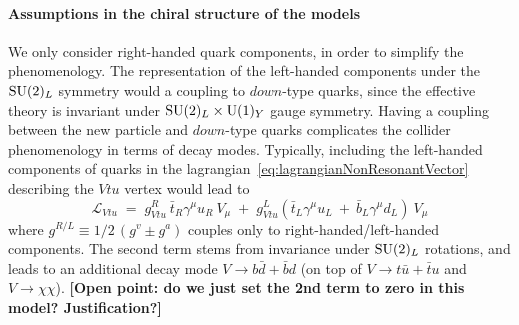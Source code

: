 
% 
\paragraph{Assumptions in the chiral structure of the models}

We only consider right-handed quark components, in order to simplify the phenomenology. 
The representation of the left-handed components under the $\mathrm{SU}(2)_{L}$ symmetry would a 
coupling to $down$-type quarks, since the effective theory is invariant under $\mathrm{SU}(2)_{L} \times \mathrm{U}(1)_{Y}$ 
gauge symmetry. Having a coupling between the new particle and $down$-type quarks 
complicates the collider phenomenology in terms of decay modes. Typically, including 
the left-handed components of quarks in the lagrangian~\eqref{eq:lagrangianNonResonantVector} 
describing the $Vtu$ vertex would lead to 
\begin{equation}
 \mathcal{L}_{Vtu} \; = \;  g^{R}_{Vtu} \: \bar{t}_{R}\gamma^{\mu}u_R \: V_{\mu} \; + \; g^{L}_{Vtu} 
 (\bar{t}_{L}\gamma^{\mu}u_L \: + \:  \bar{b}_{L}\gamma^{\mu}d_L ) \: V_{\mu}
\end{equation}
where $g^{R/L} \equiv 1/2 \, (g^{v} \pm g^{a})$ couples only to right-handed/left-handed components. 
The second term stems from invariance under $\mathrm{SU}(2)_{L}$ rotations, and leads to an additional 
decay mode $V \to b\bar{d} + \bar{b}d$ (on top of $V \to t\bar{u} + \bar{t}u$ and $V \to \chi\chi$). 
\textbf{[Open point: do we just set the 2nd term to zero in this model? Justification?]}

